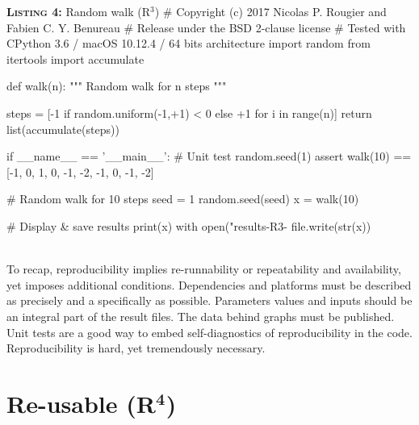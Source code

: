 \documentclass[a4paper,11pt]{article}
\begin{document}
\noindent \begin{minipage}[c]{\linewidth}
\begin{code}{\textbf{\textsc{Listing 4:}} Random walk (R$^3$)}
# Copyright (c) 2017 Nicolas P. Rougier and Fabien C. Y. Benureau
# Release under the BSD 2-clause license
# Tested with CPython 3.6 / macOS 10.12.4 / 64 bits architecture
import random
from itertools import accumulate

def walk(n):
    """ Random walk for n steps """
  
    steps = [-1 if random.uniform(-1,+1) < 0 else +1 for i in range(n)]
    return list(accumulate(steps))

if __name__ == '__main__':
    # Unit test
    random.seed(1)
    assert walk(10) == [-1, 0, 1, 0, -1, -2, -1, 0, -1, -2]

    # Random walk for 10 steps
    seed = 1
    random.seed(seed)
    x = walk(10)
    
    # Display & save results
    print(x)
    with open("results-R3-%
        file.write(str(x))
\end{code}
\end{minipage}\\

To recap, reproducibility implies re-runnability or repeatability and availability, yet  imposes additional conditions. Dependencies and platforms must be described as precisely and a specifically as possible. Parameters values and inputs should be an integral part of the result files. The data behind graphs must be published. Unit tests are a good way to embed self-diagnostics of reproducibility in the code. Reproducibility is hard, yet tremendously necessary.


\section*{Re-usable (R$^{\mathbf 4}$)}
\end{document}
